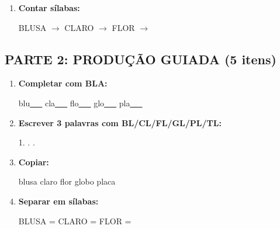\begin{exercicio}
\begin{enumerate}
  \item \textbf{Contar sílabas:}
  \begin{center}
  BLUSA $\rightarrow$ \underline{\hspace{0.9cm}} \quad CLARO $\rightarrow$ \underline{\hspace{0.9cm}} \quad FLOR $\rightarrow$ \underline{\hspace{0.9cm}}
  \end{center}

\end{enumerate}

\subsection*{PARTE 2: PRODUÇÃO GUIADA (5 itens)}

\begin{enumerate}[resume]

  \item \textbf{Completar com BLA:}
  \begin{center}
  blu\underline{~~~} \quad cla\underline{~~~} \quad flo\underline{~~~} \quad glo\underline{~~~} \quad pla\underline{~~~}
  \end{center}

  \item \textbf{Escrever 3 palavras com BL/CL/FL/GL/PL/TL:}
  \begin{center}
  1. \underline{\hspace{3cm}} . \underline{\hspace{3cm}} . \underline{\hspace{3cm}}
  \end{center}

  \item \textbf{Copiar:}
  \begin{center}
  blusa \quad claro \quad flor \quad globo \quad placa
  \end{center}

  \item \textbf{Separar em sílabas:}
  \begin{center}
  BLUSA = \underline{\hspace{1cm}} \underline{\hspace{1cm}} \quad CLARO = \underline{\hspace{1cm}} \underline{\hspace{1cm}} \quad FLOR = \underline{\hspace{1cm}} \underline{\hspace{1cm}}
  \end{center}


\end{enumerate}
\end{exercicio}
